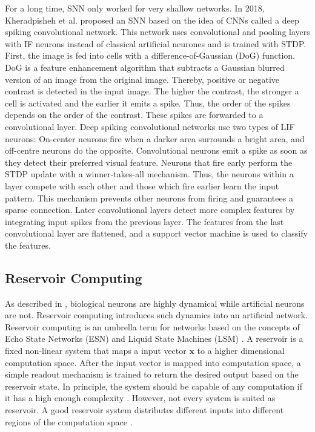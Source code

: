 For a long time, SNN only worked for very shallow networks.
In 2018, Kheradpisheh et al.  proposed an SNN based on the idea of CNNs called a deep spiking convolutional network.
This network uses convolutional and pooling layers with IF neurons instead of classical artificial neurones and is trained with STDP.
First, the image is fed into cells with a difference-of-Gaussian (DoG) function.
DoG is a feature enhancement algorithm that subtracts a Gaussian blurred version of an image from the original image.
Thereby, positive or negative contrast is detected in the input image.
The higher the contrast, the stronger a cell is activated and the earlier it emits a spike.
Thus, the order of the spikes depends on the order of the contrast.
These spikes are forwarded to a convolutional layer.
Deep spiking convolutional networks use two types of LIF neurons: On-center neurons fire when a darker area surrounds a bright area, and off-centre neurons do the opposite.
Convolutional neurons emit a spike as soon as they detect their preferred visual feature.
Neurons that fire early perform the STDP update with a winner-takes-all mechanism.
Thus, the neurons within a layer compete with each other and those which fire earlier learn the input pattern.
This mechanism prevents other neurons from firing and guarantees a sparse connection.
Later convolutional layers detect more complex features by integrating input spikes from the previous layer.
The features from the last convolutional layer are flattened, and a support vector machine is used to classify the features.









\subsection{Reservoir Computing}
As described in , biological neurons are highly dynamical while artificial neurons are not.
Reservoir computing introduces such dynamics into an artificial network.
Reservoir computing is an umbrella term for networks based on the concepts of Echo State Networks (ESN)  and Liquid State Machines (LSM) .
A reservoir is a fixed non-linear system that maps a input vector \(\boldsymbol{x}\) to a higher dimensional computation space.
After the input vector is mapped into computation space, a simple readout mechanism is trained to return the desired output based on the reservoir state.
In principle, the system should be capable of any computation if it has a high enough complexity .
However, not every system is suited as reservoir.
A good reservoir system distributes different inputs into different regions of the computation space \cite{Konkoli_2018}.

